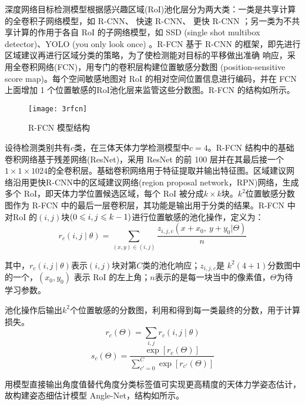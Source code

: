 \documentclass{dmuthesis}
\begin{document}
深度网络目标检测模型根据感兴趣区域(RoI)池化层分为两大类：一类是共享计算的全卷积子网络模型，如 R-CNN、 快速 R-CNN、 更快 R-CNN ；另一类为不共享计算的作用于各自 RoI 的子网络模型，如 SSD (single shot multibox detector)、YOLO (you only look once) 。R-FCN 基于 R-CNN 的框架，即先进行区域建议再进行区域分类的策略，为了使检测能对目标的平移做出准确 响应，采用全卷积网络(FCN)，用专门的卷积层构建位置敏感分数图 (position-sensitive score map)。每个空间敏感地图对 RoI 的相对空间位置信息进行编码，并在 FCN 上面增加 1 个位置敏感的RoI池化层来监管这些分数图。R-FCN 的结构如所示。

\begin{figure}[!htbp]
	\centering
	\texttt{[image: 3rfcn]}
	\caption{R-FCN 模型结构}
     \label{figrfcn}
\end{figure}

设待检测类别共有$c$类，在三体天体力学检测模型中$c = 4$。R-FCN 结构中的基础卷积网络基于残差网络(ResNet)，采用 ResNet 的前 100 层并在其最后接一个$1\times1\times1024$的全卷积层。基础卷积网络用于特征提取并输出特征图。区域建议网络沿用更快R-CNN中的区域建议网络(region proposal network，RPN)网络，生成多个 RoI，即天体力学位置候选区域，每个 RoI 被分成$k\times k$块。$k^2$位置敏感分数图作为 R-FCN 中的最后一层卷积层，其功能是输出用于分类的结果。R-FCN 中对RoI 的$(i, j)$块$(0\leqslant i, j\leqslant k-1)$进行位置敏感的池化操作，定义为：
\begin{equation}
r_c(i,j\mid\theta)=\sum_{(x,y)\in(i,j)}\frac{z_{i,j,c}(x+x_0,\ y+y_0|\Theta)}{n}
\label{eqrcijt}
\end{equation}

其中，$r_c(i,j\mid\theta)$表示$ (i, j) $块对第$ C $类的池化响应；$z_{i,j,c}$是 $k^2(4 + 1)$分数图中的一个，$(x_0, y_0)$ 表示 RoI 的左上角；$n$表示的是每一块当中的像素值，$\Theta$为待学习参数。

池化操作后输出$k^2$个位置敏感的分数图，利用和得到每一类最终的分数，用于计算损失。
\begin{equation}
r_c(\Theta)=\sum_{i,j}r_c(i,j\mid\theta)
\label{eqrc}
\end{equation}
\begin{equation}
s_c(\Theta)=\dfrac{\exp[{r_c(\Theta)}]}{\sum\limits_{c'=0}^C\exp[{r_{c'}(\Theta)}]}
\label{eqsc}
\end{equation}

用模型直接输出角度值替代角度分类标签值可实现更高精度的天体力学姿态估计，故构建姿态细估计模型 Angle-Net，结构如所示。
\end{document}
